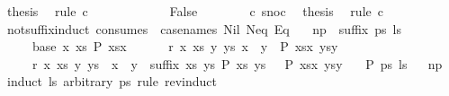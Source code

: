 \begin{isabellebody}
\ {\isacharquery}thesis\ \isamarkupfalse%
\ {\isacharparenleft}rule\ c{}{\isacharparenright}\isanewline
\ \ \ \ \isamarkupfalse%
\isanewline
\ \ \ \ \ \ \isamarkupfalse%
\ False\isanewline
\ \ \ \ \ \ \isamarkupfalse%
\ c\ snoc\ \isamarkupfalse%
\ {\isacharquery}thesis\ \isamarkupfalse%
\ {\isacharparenleft}rule\ c{}{\isacharparenright}\isanewline
\ \ \ \ \isamarkupfalse%
\isanewline
\ \ \isamarkupfalse%
\isanewline
{}\isamarkupfalse%
%
\endisatagproof
{\isafoldproof}%
%
\isadelimproof
\isanewline
%
\endisadelimproof
\isanewline
{}\isamarkupfalse%
\ not{\isacharunderscore}suffix{\isacharunderscore}induct\ {\isacharbrackleft}consumes\ {}{\isacharcomma}\ case{\isacharunderscore}names\ Nil\ Neq\ Eq{\isacharbrackright}{\isacharcolon}\isanewline
\ \ \ np{\isacharcolon}\ {\isachardoublequoteopen}{\isasymnot}\ suffix\ ps\ ls{\isachardoublequoteclose}\isanewline
\ \ \ \ \ base{\isacharcolon}\ {\isachardoublequoteopen}{\isasymAnd}x\ xs{\isachardot}\ P\ {\isacharparenleft}xs{\isacharat}{\isacharbrackleft}x{\isacharbrackright}{\isacharparenright}\ {\isacharbrackleft}{\isacharbrackright}{\isachardoublequoteclose}\isanewline
\ \ \ \ \ r{}{\isacharcolon}\ {\isachardoublequoteopen}{\isasymAnd}x\ xs\ y\ ys{\isachardot}\ x\ {\isasymnoteq}\ y\ {\isasymLongrightarrow}\ P\ {\isacharparenleft}xs{\isacharat}{\isacharbrackleft}x{\isacharbrackright}{\isacharparenright}\ {\isacharparenleft}ys{\isacharat}{\isacharbrackleft}y{\isacharbrackright}{\isacharparenright}{\isachardoublequoteclose}\isanewline
\ \ \ \ \ r{}{\isacharcolon}\ {\isachardoublequoteopen}{\isasymAnd}x\ xs\ y\ ys{\isachardot}\ {\isasymlbrakk}\ x\ {\isacharequal}\ y{\isacharsemicolon}\ {\isasymnot}\ suffix\ xs\ ys{\isacharsemicolon}\ P\ xs\ ys\ {\isasymrbrakk}\ {\isasymLongrightarrow}\ P\ {\isacharparenleft}xs{\isacharat}{\isacharbrackleft}x{\isacharbrackright}{\isacharparenright}\ {\isacharparenleft}ys{\isacharat}{\isacharbrackleft}y{\isacharbrackright}{\isacharparenright}{\isachardoublequoteclose}\isanewline
\ \ \ {\isachardoublequoteopen}P\ ps\ ls{\isachardoublequoteclose}%
\isadelimproof
\ %
\endisadelimproof
%
\isatagproof
{}\isamarkupfalse%
\ np\isanewline
{}\isamarkupfalse%
\ {\isacharparenleft}induct\ ls\ arbitrary{\isacharcolon}\ ps\ rule{\isacharcolon}\ rev{\isacharunderscore}induct{\isacharparenright}\isanewline

\end{isabellebody}
